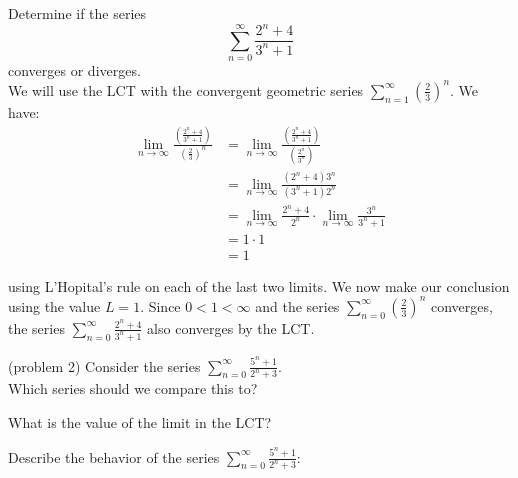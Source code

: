 \documentclass[handout]{ximera}
\begin{document}
\begin{example}[example 2]
Determine if the series 
\[
\sum_{n=0}^\infty \frac{2^n + 4}{3^n + 1}
\]
converges or diverges.\\
We will use the LCT with the convergent geometric series $\displaystyle{\sum_{n=1}^\infty \left(\frac23\right)^n}$. We have:
\begin{align*}
\lim_{n \to \infty} \frac{\left(\frac{2^n + 4}{3^n + 1}\right)}{\left(\frac23\right)^n} &= \lim_{n \to \infty} \frac{\left(\frac{2^n + 4}{3^n + 1}\right)}{\left(\frac{2^n}{3^n}\right)}\\
&=\lim_{n \to \infty} \frac{(2^n + 4)3^n}{(3^n + 1)2^n}\\
&= \lim_{n \to \infty} \frac{2^n + 4}{2^n} \cdot \lim_{n \to \infty}\frac{3^n}{3^n + 1}\\
&= 1 \cdot 1 \\
&= 1
\end{align*}

using L'Hopital's rule on each of the last two limits. We now make our conclusion using the value $L = 1$. Since $0 < 1 < \infty$ and the series $\displaystyle{\sum_{n=0}^\infty \left(\frac23\right)^n}$
converges, the series $\displaystyle{\sum_{n=0}^\infty \frac{2^n + 4}{3^n + 1}}$ also converges by the LCT.
\end{example}




\begin{problem}(problem 2)
Consider the series $\displaystyle{\sum_{n=0}^\infty \frac{5^n + 1}{2^n + 3}}$.\\
Which series should we compare this to?

\begin{multipleChoice}
\end{multipleChoice}

What is the value of the limit in the LCT?
\begin{multipleChoice}
\end{multipleChoice}

Describe the behavior of the series $\displaystyle{\sum_{n=0}^\infty \frac{5^n + 1}{2^n + 3}:}$
\begin{multipleChoice}
\end{multipleChoice}

\end{problem}
\end{document}
